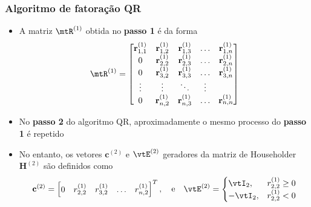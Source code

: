 \begin{frame}
  \frametitle{Algoritmo de fatoração QR}
  \begin{itemize}
    \item A matriz $\mtR^{(1)}$ obtida no \textbf{passo 1} é da forma
    \begin{equation}
      \mtR^{(1)} =
      \left[\begin{matrix}
        \mathbf{r}^{(1)}_{1,1} & \mathbf{r}^{(1)}_{1,2} & \mathbf{r}^{(1)}_{1,3} & \ldots & \mathbf{r}^{(1)}_{1,n} \\
        0 & \mathbf{r}^{(1)}_{2,2} & \mathbf{r}^{(1)}_{2,3} & \ldots & \mathbf{r}^{(1)}_{2,n} \\
        0 & \mathbf{r}^{(1)}_{3,2} & \mathbf{r}^{(1)}_{3,3} & \ldots & \mathbf{r}^{(1)}_{3,n} \\
        \vdots & \vdots & \ddots & \vdots \\
        0 & \mathbf{r}^{(1)}_{n,2} & \mathbf{r}^{(1)}_{n,3} & \ldots & \mathbf{r}^{(1)}_{n,n}
      \end{matrix}\right]
    \end{equation}
    \item No \textbf{passo 2} do algoritmo QR, aproximadamente o mesmo processo do \textbf{passo 1} é repetido
    \item No entanto, os vetores $\mathbf{c}^{(2)}$ e $\vtE^{(2)}$ geradores da matriz de Householder $\mathbf{H}^{(2)}$ são definidos como
    \begin{equation}\label{eq_hh2}
      \mathbf{c}^{(2)} = \left[\begin{matrix}
        0 & r^{(1)}_{2,2} & r^{(1)}_{3,2} & \ldots & r^{(1)}_{n,2}
      \end{matrix}\right]^{T}, \quad \text{e} \quad
      \vtE^{(2)} =
      \begin{cases}
        \vtI_2, & r^{(1)}_{2,2} \geq 0 \\
        -\vtI_2, & r^{(1)}_{2,2} < 0
      \end{cases}
    \end{equation}
  \end{itemize}
\end{frame}


